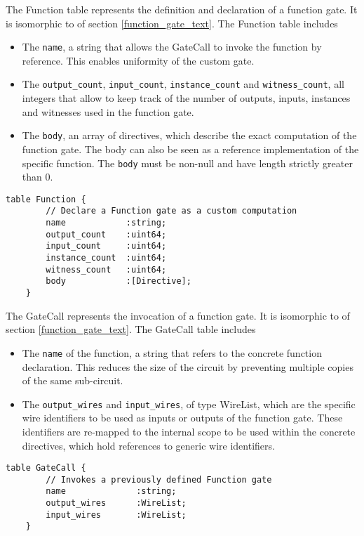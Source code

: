 The \textsf{Function} table represents the definition and declaration of a function gate. It is isomorphic to  of section \ref{function_gate_text}. The \textsf{Function} table includes
\begin{itemize}
    \item The \texttt{name}, a string that allows the \textsf{GateCall} to invoke the function by reference. This enables uniformity of the custom gate.
    \item The \texttt{output\_count}, \texttt{input\_count}, \texttt{instance\_count} and \texttt{witness\_count}, all integers that allow to keep track of the number of outputs, inputs, instances and witnesses used in the function gate.
    \item The \texttt{body}, an array of directives, which describe the exact computation of the function gate. The body can also be seen as a reference implementation of the specific function.
    The \texttt{body} must be non-null and have length strictly greater than 0.
\end{itemize}

\begin{lstlisting}[style=fbslisting]
    table Function {
        // Declare a Function gate as a custom computation
        name            :string;
        output_count    :uint64;
        input_count     :uint64;
        instance_count  :uint64;
        witness_count   :uint64;
        body            :[Directive];
    }
\end{lstlisting}

The \textsf{GateCall} represents the invocation of a function gate. It is isomorphic to  of section \ref{function_gate_text}. The \textsf{GateCall} table includes
\begin{itemize}
    \item The \texttt{name} of the function, a string that refers to the concrete function declaration. This reduces the size of the circuit by preventing multiple copies of the same sub-circuit.
    \item The \texttt{output\_wires} and \texttt{input\_wires}, of type \textsf{WireList}, which are the specific wire identifiers to be used as inputs or outputs of the function gate. These identifiers are re-mapped to the internal scope to be used within the concrete directives, which hold references to generic wire identifiers.  
\end{itemize}

\begin{lstlisting}[style=fbslisting]
    table GateCall {
        // Invokes a previously defined Function gate
        name              :string;
        output_wires      :WireList;
        input_wires       :WireList;
    }
\end{lstlisting}

